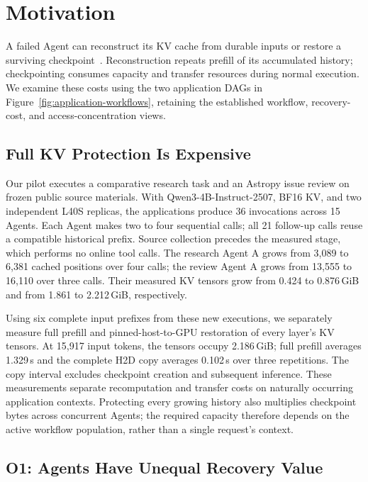 \section{Motivation}\label{sec:motivation}

A failed Agent can reconstruct its KV cache from durable inputs or restore a surviving checkpoint~\cite{strati2024dejavu,cao2026lumen}. Reconstruction repeats prefill of its accumulated history; checkpointing consumes capacity and transfer resources during normal execution. We examine these costs using the two application DAGs in Figure~\ref{fig:application-workflows}, retaining the established workflow, recovery-cost, and access-concentration views.

\subsection{Full KV Protection Is Expensive}\label{sec:motivation:cost}

Our pilot executes a comparative research task and an Astropy issue review on frozen public source materials. With Qwen3-4B-Instruct-2507, BF16 KV, and two independent L40S replicas, the applications produce 36 invocations across 15 Agents. Each Agent makes two to four sequential calls; all 21 follow-up calls reuse a compatible historical prefix. Source collection precedes the measured stage, which performs no online tool calls. The research Agent A grows from 3,089 to 6,381 cached positions over four calls; the review Agent A grows from 13,555 to 16,110 over three calls. Their measured KV tensors grow from 0.424 to 0.876\,GiB and from 1.861 to 2.212\,GiB, respectively.

Using six complete input prefixes from these new executions, we separately measure full prefill and pinned-host-to-GPU restoration of every layer's KV tensors. At 15,917 input tokens, the tensors occupy 2.186\,GiB; full prefill averages 1.329\,s and the complete H2D copy averages 0.102\,s over three repetitions. The copy interval excludes checkpoint creation and subsequent inference. These measurements separate recomputation and transfer costs on naturally occurring application contexts. Protecting every growing history also multiplies checkpoint bytes across concurrent Agents; the required capacity therefore depends on the active workflow population, rather than a single request's context.

\subsection{O1: Agents Have Unequal Recovery Value}\label{sec:motivation:agent}

